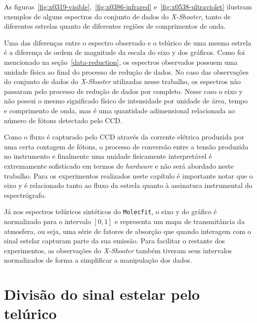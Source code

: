 As figuras~\ref{fig:x0319-visible},~\ref{fig:x0386-infrared} e~\ref{fig:x0538-ultraviolet} ilustram exemplos de alguns espectros do conjunto de dados do \textit{X-Shooter}, tanto de diferentes estrelas quanto de diferentes regiões de comprimentos de onda. 

Uma das diferenças entre o espectro observado e o telúrico de uma mesma estrela é a diferença de ordem de magnitude da escala do eixo y dos gráficos. Como foi mencionado na seção~\ref{data-reduction}, os espectros observados possuem uma unidade física ao final do processo de redução de dados. No caso das observações do conjunto de dados do \textit{X-Shooter} utilizadas nesse trabalho, os espectros não passaram pelo processo de redução de dados por completo. Nesse caso o eixo y não possui o mesmo significado físico de intensidade por unidade de área, tempo e comprimento de onda, mas é uma quantidade adimensional relacionada ao número de fótons detectado pelo CCD.

Como o fluxo é capturado pelo CCD através da corrente elétrica produzida por uma certa contagem de fótons, o processo de conversão entre a tensão produzida no instrumento e finalmente uma unidade fisicamente interpretável é extremamente sofisticado em termos de \textit{hardware} e não será abordado neste trabalho. Para os experimentos realizados neste capítulo é importante notar que o eixo y é relacionado tanto ao fluxo da estrela quanto à assinatura instrumental do espectrógrafo. 

Já nos espectros telúricos sintéticos do \texttt{Molecfit}, o eixo y do gráfico é normalizado para o intervalo $[0, 1]$ e representa um mapa de transmitância da atmosfera, ou seja, uma série de fatores de absorção que quando interagem com o sinal estelar capturam parte da sua emissão. Para facilitar o restante dos experimentos, as observações do \textit{X-Shooter} também tiveram seus intervalos normalizados de forma a simplificar a manipulação dos dados.

\section{Divisão do sinal estelar pelo telúrico}

